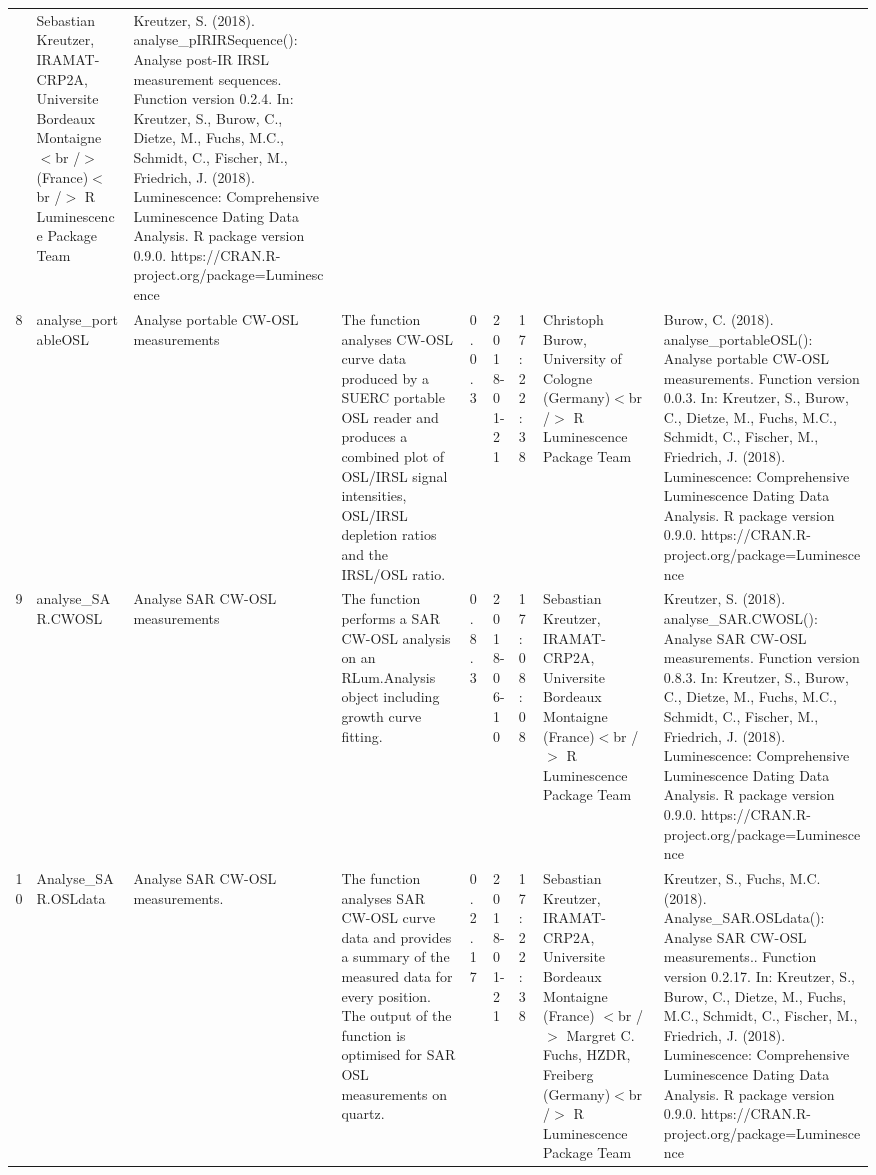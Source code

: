 \begin{table}[ht]
\begin{tabular}{rllllllll}
 & Sebastian Kreutzer, IRAMAT-CRP2A, Universite Bordeaux Montaigne$<$br /$>$ (France)$<$br /$>$  R Luminescence Package Team & Kreutzer, S. (2018). analyse\_pIRIRSequence(): Analyse post-IR IRSL measurement sequences. Function version 0.2.4. In: Kreutzer, S., Burow, C., Dietze, M., Fuchs, M.C., Schmidt, C., Fischer, M., Friedrich, J. (2018). Luminescence: Comprehensive Luminescence Dating Data Analysis. R package version 0.9.0. https://CRAN.R-project.org/package=Luminescence
 \\ 
  8 & analyse\_portableOSL & Analyse portable CW-OSL measurements & The function analyses CW-OSL curve data produced by a SUERC portable OSL reader and produces a combined plot of OSL/IRSL signal intensities, OSL/IRSL depletion ratios and the IRSL/OSL ratio. & 0.0.3 & 2018-01-21 & 17:22:38
 & Christoph Burow, University of Cologne (Germany)$<$br /$>$  R Luminescence Package Team & Burow, C. (2018). analyse\_portableOSL(): Analyse portable CW-OSL measurements. Function version 0.0.3. In: Kreutzer, S., Burow, C., Dietze, M., Fuchs, M.C., Schmidt, C., Fischer, M., Friedrich, J. (2018). Luminescence: Comprehensive Luminescence Dating Data Analysis. R package version 0.9.0. https://CRAN.R-project.org/package=Luminescence
 \\ 
  9 & analyse\_SAR.CWOSL & Analyse SAR CW-OSL measurements & The function performs a SAR CW-OSL analysis on an RLum.Analysis  object including growth curve fitting. & 0.8.3 & 2018-06-10 & 17:08:08
 & Sebastian Kreutzer, IRAMAT-CRP2A, Universite Bordeaux Montaigne (France)$<$br /$>$  R Luminescence Package Team & Kreutzer, S. (2018). analyse\_SAR.CWOSL(): Analyse SAR CW-OSL measurements. Function version 0.8.3. In: Kreutzer, S., Burow, C., Dietze, M., Fuchs, M.C., Schmidt, C., Fischer, M., Friedrich, J. (2018). Luminescence: Comprehensive Luminescence Dating Data Analysis. R package version 0.9.0. https://CRAN.R-project.org/package=Luminescence
 \\ 
  10 & Analyse\_SAR.OSLdata & Analyse SAR CW-OSL measurements. & The function analyses SAR CW-OSL curve data and provides a summary of the measured data for every position. The output of the function is optimised for SAR OSL measurements on quartz. & 0.2.17 & 2018-01-21 & 17:22:38
 & Sebastian Kreutzer, IRAMAT-CRP2A, Universite Bordeaux Montaigne (France) $<$br /$>$ Margret C. Fuchs, HZDR, Freiberg (Germany)$<$br /$>$  R Luminescence Package Team & Kreutzer, S., Fuchs, M.C. (2018). Analyse\_SAR.OSLdata(): Analyse SAR CW-OSL measurements.. Function version 0.2.17. In: Kreutzer, S., Burow, C., Dietze, M., Fuchs, M.C., Schmidt, C., Fischer, M., Friedrich, J. (2018). Luminescence: Comprehensive Luminescence Dating Data Analysis. R package version 0.9.0. https://CRAN.R-project.org/package=Luminescence

\end{tabular}
\end{table}
